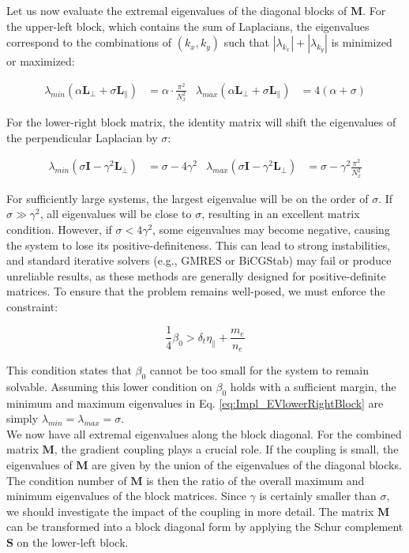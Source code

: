 Let us now evaluate the extremal eigenvalues of the diagonal blocks of $\mathbf{M}$. For the upper-left block, which contains the sum of Laplacians, the eigenvalues correspond to the combinations of $(k_x,k_y)$ such that $|\lambda_{k_x}|+|\lambda_{k_y}|$ is minimized or maximized:

\begin{align}
	\label{eq:Impl_EVupperLeftBlock}
	\lambda_{min}(\alpha \textbf{L}_\perp + \sigma \textbf{L}_\parallel) &= \alpha\cdot\frac{\pi^2}{N_x^2} & \lambda_{max}(\alpha \textbf{L}_\perp + \sigma \textbf{L}_\parallel) &= 4(\alpha + \sigma)
\end{align}

For the lower-right block matrix, the identity matrix will shift the eigenvalues of the perpendicular Laplacian by $\sigma$:

\begin{align}
	\label{eq:Impl_EVlowerRightBlock}
	\lambda_{min}(\sigma \textbf{I} - \gamma^2 \textbf{L}_\perp) &= \sigma - 4\gamma^2 & \lambda_{max}(\sigma \textbf{I} - \gamma^2 \textbf{L}_\perp) &= \sigma - \gamma^2\frac{\pi^2}{N_x^2}
\end{align}

For sufficiently large systems, the largest eigenvalue will be on the order of $\sigma$. If $\sigma \gg \gamma^2$, all eigenvalues will be close to $\sigma$, resulting in an excellent matrix condition. However, if $\sigma < 4\gamma^2$, some eigenvalues may become negative, causing the system to lose its positive-definiteness. This can lead to strong instabilities, and standard iterative solvers (e.g., GMRES or BiCGStab) may fail or produce unreliable results, as these methods are generally designed for positive-definite matrices. To ensure that the problem remains well-posed, we must enforce the constraint:

\begin{equation}
	\label{eq:Impl_conditionPositiveDefinite}
	\frac{1}{4}\beta_0 > \delta_t\eta_\parallel + \frac{m_e}{n_e} 
\end{equation}

This condition states that $\beta_0$ cannot be too small for the system to remain solvable. Assuming this lower condition on $\beta_0$ holds with a sufficient margin, the minimum and maximum eigenvalues in Eq. \ref{eq:Impl_EVlowerRightBlock} are simply $\lambda_{min} = \lambda_{max} = \sigma$. \\

We now have all extremal eigenvalues along the block diagonal. For the combined matrix $\mathbf{M}$, the gradient coupling plays a crucial role. If the coupling is small, the eigenvalues of $\mathbf{M}$ are given by the union of the eigenvalues of the diagonal blocks. The condition number of $\mathbf{M}$ is then the ratio of the overall maximum and minimum eigenvalues of the block matrices. Since $\gamma$ is certainly smaller than $\sigma$, we should investigate the impact of the coupling in more detail. The matrix $\mathbf{M}$ can be transformed into a block diagonal form by applying the Schur complement $\mathbf{S}$ on the lower-left block.


